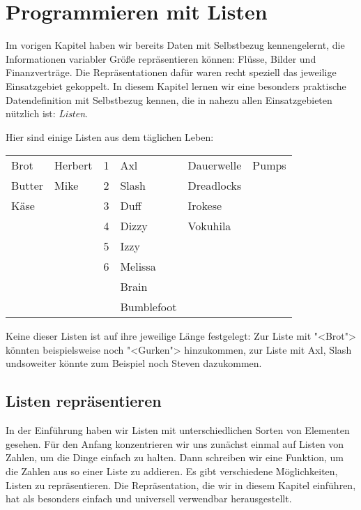 
\chapter{Programmieren mit Listen}
\label{cha:rek}
\label{cha:list}

%
Im vorigen Kapitel haben wir bereits Daten mit Selbstbezug
kennengelernt, die Informationen variabler Größe repräsentieren
können: Flüsse, Bilder und Finanzverträge.  Die Repräsentationen dafür
waren recht speziell das jeweilige Einsatzgebiet gekoppelt.  In diesem
Kapitel lernen wir eine besonders praktische Datendefinition mit
Selbstbezug kennen, die in nahezu allen Einsatzgebieten nützlich ist:
\textit{Listen}.

Hier sind einige Listen aus dem täglichen Leben:
%
\begin{center}
  \begin{tabular}{l@{\qquad}l@{\qquad}l@{\qquad}l@{\qquad}l@{\qquad}l}
  Brot & Herbert & 1 & Axl & Dauerwelle & Pumps \\
  Butter & Mike & 2 & Slash & Dreadlocks \\
  Käse & & 3 & Duff & Irokese \\
  & & 4 & Dizzy & Vokuhila \\
  && 5 & Izzy \\
  && 6 & Melissa \\
  &&& Brain\\
  &&& Bumblefoot 
\end{tabular}
\end{center}
%
Keine dieser Listen ist auf ihre jeweilige Länge festgelegt: Zur Liste
mit "<Brot"> könnten beispielsweise noch "<Gurken"> hinzukommen, zur
Liste mit Axl, Slash undsoweiter könnte zum Beispiel noch Steven
dazukommen.

\section{Listen repräsentieren}

In der Einführung haben wir Listen mit unterschiedlichen Sorten von
Elementen gesehen.  Für den Anfang konzentrieren wir uns zunächst
einmal auf Listen von Zahlen, um die Dinge einfach zu halten.  Dann
schreiben wir eine Funktion, um die Zahlen aus so einer Liste zu
addieren. Es gibt verschiedene Möglichkeiten, Listen zu
repräsentieren.  Die Repräsentation, die wir in diesem Kapitel
einführen, hat als besonders einfach und universell verwendbar
herausgestellt.

